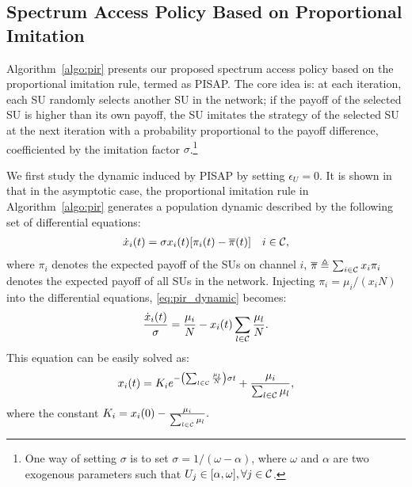 \documentclass[12pt, onecolumn]{IEEEtran}
\theoremstyle{plain}
\theoremstyle{definition}
\begin{document}
\subsection{Spectrum Access Policy Based on Proportional Imitation}

Algorithm~\ref{algo:pir} presents our proposed spectrum access policy based on the proportional imitation rule, termed as PISAP. The core idea is:
at each iteration, each SU randomly selects another SU in the network; if the payoff of the selected SU is higher than its own payoff, the SU imitates the strategy of the selected SU at the next iteration with a probability proportional to the payoff difference, coefficiented by the imitation factor $\sigma$.\footnote{One way of setting $\sigma$ is to set $\sigma=1/(\omega-\alpha)$, where $\omega$ and $\alpha$ are two exogenous parameters such that $U_j \in [\alpha,\omega], \forall j\in{\cal C}$.}

\begin{comment}

\begin{algorithm}
\caption{PISAP: executed at each SU $j$}
\begin{algorithmic}[1]
\STATE \textbf{Initialization}: set the imitation factor $\sigma$ and the imitation threshold $\epsilon_U$
\STATE For the first iteration $t=1$, randomly choose a channel to stay
\WHILE{at each iteration $t\ge 2$}
    \STATE Randomly select a SU $j'$
    \IF{$U_j<U_{j'}-\epsilon_U$}
        \STATE Migrate to the channel $s_{j'}$ with probability $p=\sigma (U_{j'}-U_j)$
    \ENDIF
\ENDWHILE
\end{algorithmic}
\label{algo:pir}
\end{algorithm}

\end{comment}

We first study the dynamic induced by PISAP by setting $\epsilon_U=0$. It is shown in~\cite{Sand10} that in the asymptotic case, the proportional imitation rule in Algorithm~\ref{algo:pir} generates a population dynamic described by the following set of differential equations:
\begin{eqnarray}
\dot x_i(t) = \sigma x_i(t) [\pi_i(t)-\overline{\pi}(t)] \quad i\in{\cal C},
\label{eq:pir_dynamic}
\end{eqnarray}
where $\pi_i$ denotes the expected payoff of the SUs on channel $i$, $\overline{\pi}\triangleq \sum_{i\in{\cal C}}x_i\pi_i$ denotes the expected payoff of all SUs in the network. Injecting $\pi_i=\mu_i/(x_iN)$ into the differential equations, \eqref{eq:pir_dynamic} becomes:
\begin{equation*}
\frac{\dot x_i(t)}{\sigma} = \frac{\mu_i}{N}-x_i(t)\sum_{l\in {\cal C}}\frac{\mu_l}{N}.
\end{equation*}
This equation can be easily solved as:
\begin{equation}
x_i(t) = K_ie^{-\left(\sum_{l\in {\cal C}}\frac{\mu_l}{N}\right)\sigma t}+\frac{\mu_i}{\sum_{l\in {\cal C}} \mu_l},
\label{eq:pir_x}
\end{equation}
where the constant
$K_i = x_i(0)-\frac{\mu_i}{\sum_{l\in {\cal C}} \mu_l}.$
\end{document}
